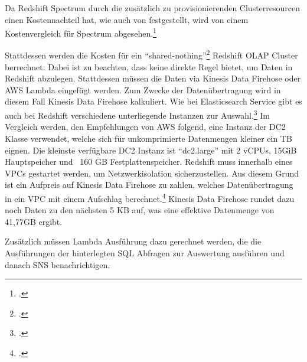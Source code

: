 Da Redshift Spectrum durch die zusätzlich zu provisionierenden Clusterresourcen einen Kostennachteil hat, wie auch von \citeauthor{Tan.2019} festgestellt, wird von einem Kostenvergleich für Spectrum abgesehen.\footcite[Vgl.][2178]{Tan.2019}

Stattdessen werden die Kosten für ein \enquote{shared-nothing}\footcite[Vgl.][2172]{Tan.2019} Redshift \ac{OLAP} Cluster berrechnet. Dabei ist zu beachten, dass \AWSIOT{} keine direkte Regel bietet, um Daten in Redshift abzulegen. Stattdessen müssen die Daten via Kinesis Data Firehose oder \ac{AWS} Lambda eingefügt werden. Zum Zwecke der Datenübertragung wird in diesem Fall Kinesis Data Firehose kalkuliert. Wie bei Elasticsearch Service gibt es auch bei Redshift verschiedene unterliegende Instanzen zur Auswahl.\footcite[Vgl. auch im Folgenden][]{AmazonWebServicesInc..o.J.z} Im Vergleich werden, den Empfehlungen von \ac{AWS} folgend, eine Instanz der \ac{DC2} Klasse verwendet, welche sich für unkomprimierte Datenmengen kleiner ein TB eignen. Die kleinste verfügbare \ac{DC2} Instanz ist \enquote{dc2.large} mit 2 vCPUs, 15GiB Hauptspeicher und ~160 GB Festplattenspeicher. Redshift muss innerhalb eines \acp{VPC} gestartet werden, um Netzwerkisolation sicherzustellen. Aus diesem Grund ist ein Aufpreis auf Kinesis Data Firehose zu zahlen, welches Datenübertragung in ein \ac{VPC} mit einem Aufschlag berechnet.\footcite[Vgl. auch im Folgenden][]{AmazonWebServicesInc..o.J.y} Kinesis Data Firehose rundet dazu noch Daten zu den nächsten 5 KB auf, was eine effektive Datenmenge von 41,77GB ergibt.

Zusätzlich müssen Lambda Ausführung dazu gerechnet werden, die die Ausführungen der hinterlegten \ac{SQL} Abfragen zur Auswertung ausführen und danach \ac{SNS} benachrichtigen.

